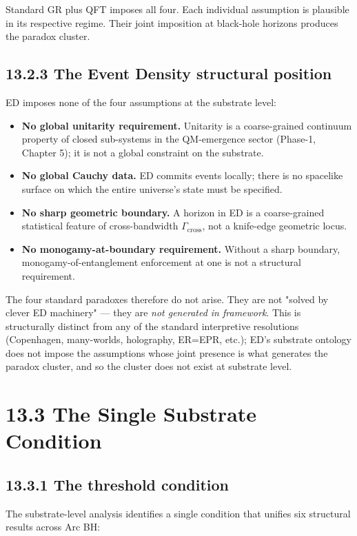 \documentclass[11pt]{book}
\begin{document}
Standard GR plus QFT imposes all four. Each individual assumption is plausible in its respective regime. Their joint imposition at black-hole horizons produces the paradox cluster.

\subsection{13.2.3 The Event Density structural position}

ED imposes none of the four assumptions at the substrate level:

\begin{itemize}
\item \textbf{No global unitarity requirement.} Unitarity is a coarse-grained continuum property of closed sub-systems in the QM-emergence sector (Phase-1, Chapter 5); it is not a global constraint on the substrate.
\item \textbf{No global Cauchy data.} ED commits events locally; there is no spacelike surface on which the entire universe's state must be specified.
\item \textbf{No sharp geometric boundary.} A horizon in ED is a coarse-grained statistical feature of cross-bandwidth $\Gamma_\mathrm{cross}$, not a knife-edge geometric locus.
\item \textbf{No monogamy-at-boundary requirement.} Without a sharp boundary, monogamy-of-entanglement enforcement at one is not a structural requirement.
\end{itemize}

The four standard paradoxes therefore do not arise. They are not "solved by clever ED machinery" — they are \textit{not generated in framework}. This is structurally distinct from any of the standard interpretive resolutions (Copenhagen, many-worlds, holography, ER=EPR, etc.); ED's substrate ontology does not impose the assumptions whose joint presence is what generates the paradox cluster, and so the cluster does not exist at substrate level.

\section{13.3 The Single Substrate Condition}

\subsection{13.3.1 The threshold condition}

The substrate-level analysis identifies a single condition that unifies six structural results across Arc BH:
\end{document}

